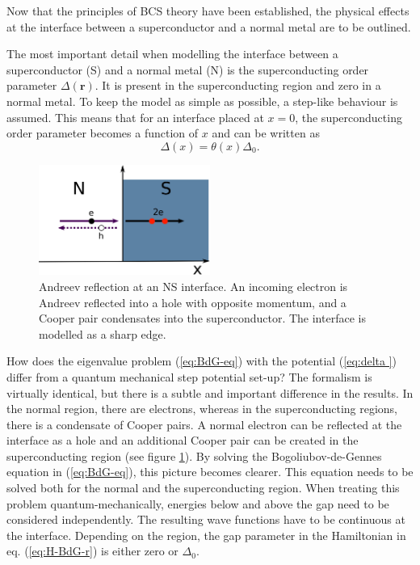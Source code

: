 Now that the principles of BCS theory have been established, the physical effects at the interface between a superconductor and a normal metal are to be outlined.

The most important detail when modelling the interface between a superconductor (S) and a normal metal (N) is the superconducting order parameter $\Delta \left( \mathbf{r} \right)$. It is present in the superconducting region and zero in a normal metal. To keep the model as simple as possible, a step-like behaviour is assumed. This means that for an interface placed at $x=0$, the superconducting order parameter becomes a function of $x$ and can be written as
\begin{equation}
\Delta \left( x \right) = \theta \left(x \right) \Delta_0.\label{eq:delta }
\end{equation}
\begin{figure}
\centering
\includegraphics[width=0.5\textwidth]{figure/framework-analytical/ns-interface}
\caption{Andreev reflection at an NS interface. An incoming electron is Andreev reflected into a hole with opposite momentum, and a Cooper pair condensates into the superconductor. The interface is modelled as a sharp edge.}\label{fig:ns-interface}
\end{figure}
How does the eigenvalue problem (\ref{eq:BdG-eq}) with the potential (\ref{eq:delta }) differ from a quantum mechanical step potential set-up? The formalism is virtually identical, but there is a subtle and important difference in the results. In the normal region, there are electrons, whereas in the superconducting regions, there is a condensate of Cooper pairs. A normal electron can be reflected at the interface as a hole and an additional Cooper pair can be created in the superconducting region (see figure \ref{fig:ns-interface}). By solving the Bogoliubov-de-Gennes equation in (\ref{eq:BdG-eq}), this picture becomes clearer.  This equation needs to be solved both for the normal and the superconducting region. When treating this problem quantum-mechanically, energies below and above the gap need to be considered independently. The resulting wave functions have to be continuous at the interface. Depending on the region, the gap parameter in the Hamiltonian in eq. (\ref{eq:H-BdG-r}) is either zero or $\Delta_0$.

